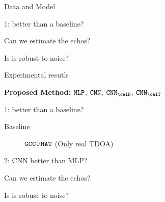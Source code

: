 \begin{frame}{Data and Model \hfill \faBrain}


    \begin{block}{1: better than a baseline?}
    \end{block}

    \begin{block}{Can we estimate the echos?}
    \end{block}

    \begin{block}{Is is robust to noise?}

    \end{block}

\end{frame}


\begin{frame}{\faFlask Experimental resutls \hfill \faBrain}

    \begin{mycontriblock}
        \textbf{Proposed Method:} $\mathtt{MLP}$, $\mathtt{CNN}$, $\CNNn$, $\CNNt$
    \end{mycontriblock}

    \begin{block}{1: better than a baseline?}
        \begin{description}
            \item[Baseline] $\mathtt{GCC}\,\mathtt{PHAT}$ (Only real TDOA)\cite{knapp1976generalized}
        \end{description}
    \end{block}

    \begin{block}{2: CNN better than MLP?}

    \end{block}

    \begin{block}{Can we estimate the echos?}
    \end{block}

    \begin{block}{Is is robust to noise?}

    \end{block}

\end{frame}





